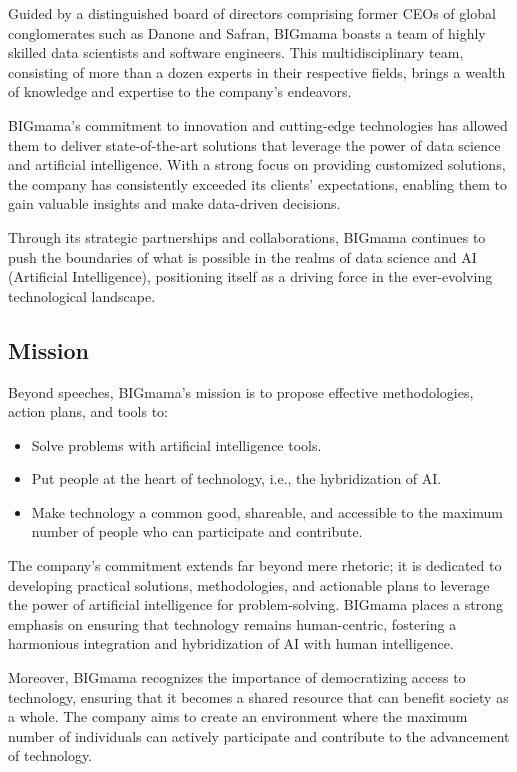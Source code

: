 Guided by a distinguished board of directors comprising former CEOs of global conglomerates such as Danone and Safran, BIGmama boasts a team of highly skilled data scientists and software engineers. This multidisciplinary team, consisting of more than a dozen experts in their respective fields, brings a wealth of knowledge and expertise to the company's endeavors.

BIGmama's commitment to innovation and cutting-edge technologies has allowed them to deliver state-of-the-art solutions that leverage the power of data science and artificial intelligence. With a strong focus on providing customized solutions, the company has consistently exceeded its clients' expectations, enabling them to gain valuable insights and make data-driven decisions.

Through its strategic partnerships and collaborations, BIGmama continues to push the boundaries of what is possible in the realms of data science and AI (Artificial Intelligence), positioning itself as a driving force in the ever-evolving technological landscape.

\subsection{Mission}

Beyond speeches, BIGmama's mission is to propose effective methodologies, action plans, and tools to:

\begin{itemize}
    \item Solve problems with artificial intelligence tools.
    \item Put people at the heart of technology, i.e., the hybridization of AI.
    \item Make technology a common good, shareable, and accessible to the maximum number of people who can participate and contribute.
\end{itemize}

The company's commitment extends far beyond mere rhetoric; it is dedicated to developing practical solutions, methodologies, and actionable plans to leverage the power of artificial intelligence for problem-solving. BIGmama places a strong emphasis on ensuring that technology remains human-centric, fostering a harmonious integration and hybridization of AI with human intelligence.

Moreover, BIGmama recognizes the importance of democratizing access to technology, ensuring that it becomes a shared resource that can benefit society as a whole. The company aims to create an environment where the maximum number of individuals can actively participate and contribute to the advancement of technology.

